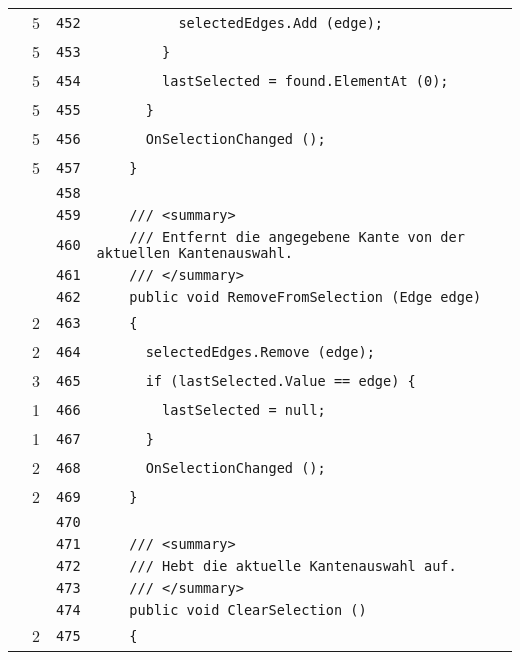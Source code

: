 \documentclass[a4paper,10pt]{article}
\begin{document}
\begin{longtable}[l]{lrrl}
\cellcolor{green} & 5 & \verb~452~ & \verb~          selectedEdges.Add (edge);~\\
\cellcolor{green} & 5 & \verb~453~ & \verb~        }~\\
\cellcolor{green} & 5 & \verb~454~ & \verb~        lastSelected = found.ElementAt (0);~\\
\cellcolor{green} & 5 & \verb~455~ & \verb~      }~\\
\cellcolor{green} & 5 & \verb~456~ & \verb~      OnSelectionChanged ();~\\
\cellcolor{green} & 5 & \verb~457~ & \verb~    }~\\
\cellcolor{gray} &  & \verb~458~ & \verb~~\\
\cellcolor{gray} &  & \verb~459~ & \verb~    /// <summary>~\\
\cellcolor{gray} &  & \verb~460~ & \verb~    /// Entfernt die angegebene Kante von der aktuellen Kantenauswahl.~\\
\cellcolor{gray} &  & \verb~461~ & \verb~    /// </summary>~\\
\cellcolor{gray} &  & \verb~462~ & \verb~    public void RemoveFromSelection (Edge edge)~\\
\cellcolor{green} & 2 & \verb~463~ & \verb~    {~\\
\cellcolor{green} & 2 & \verb~464~ & \verb~      selectedEdges.Remove (edge);~\\
\cellcolor{green} & 3 & \verb~465~ & \verb~      if (lastSelected.Value == edge) {~\\
\cellcolor{green} & 1 & \verb~466~ & \verb~        lastSelected = null;~\\
\cellcolor{green} & 1 & \verb~467~ & \verb~      }~\\
\cellcolor{green} & 2 & \verb~468~ & \verb~      OnSelectionChanged ();~\\
\cellcolor{green} & 2 & \verb~469~ & \verb~    }~\\
\cellcolor{gray} &  & \verb~470~ & \verb~~\\
\cellcolor{gray} &  & \verb~471~ & \verb~    /// <summary>~\\
\cellcolor{gray} &  & \verb~472~ & \verb~    /// Hebt die aktuelle Kantenauswahl auf.~\\
\cellcolor{gray} &  & \verb~473~ & \verb~    /// </summary>~\\
\cellcolor{gray} &  & \verb~474~ & \verb~    public void ClearSelection ()~\\
\cellcolor{green} & 2 & \verb~475~ & \verb~    {~\\

\end{longtable}
\end{document}
